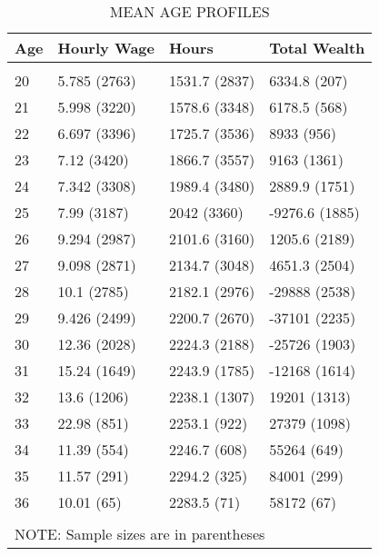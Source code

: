 
%
 \hypertarget{MeanAgeProfiles}{}
  \begin{table}
  \centering
  \caption{\label{tab:MeanAgeProfiles} \\
      \scriptsize MEAN AGE PROFILES
    }
  \begin{tabular}{l l l l}
   \hline%
 Age &  Hourly Wage &  Hours &  Total Wealth \\ \hline \\
       20 & 5.785 (2763) & 1531.7 (2837) & 6334.8 (207) \\ 
        21 & 5.998 (3220) & 1578.6 (3348) & 6178.5 (568) \\ 
        22 & 6.697 (3396) & 1725.7 (3536) & 8933 (956) \\ 
        23 & 7.12 (3420) & 1866.7 (3557) & 9163 (1361) \\ 
        24 & 7.342 (3308) & 1989.4 (3480) & 2889.9 (1751) \\ 
        25 & 7.99 (3187) & 2042 (3360) & -9276.6 (1885) \\ 
        26 & 9.294 (2987) & 2101.6 (3160) & 1205.6 (2189) \\ 
        27 & 9.098 (2871) & 2134.7 (3048) & 4651.3 (2504) \\ 
        28 & 10.1 (2785) & 2182.1 (2976) & -29888 (2538) \\
        29 & 9.426 (2499) & 2200.7 (2670) & -37101 (2235) \\ 
    30 & 12.36 (2028) & 2224.3 (2188) & -25726 (1903) \\ 
    31 & 15.24 (1649) & 2243.9 (1785) & -12168 (1614) \\ 
        32 & 13.6 (1206) & 2238.1 (1307) & 19201 (1313) \\ 
        33 & 22.98 (851) & 2253.1 (922) & 27379 (1098) \\ 
        34 & 11.39 (554) & 2246.7 (608) & 55264 (649) \\
        35 & 11.57 (291) & 2294.2 (325) & 84001 (299) \\
        36 & 10.01 (65) & 2283.5 (71) & 58172 (67) \\ 
\\ \hline
  \multicolumn{4}{l}{NOTE: Sample sizes are in parentheses} 
  \end{tabular}
  \end{table}
%
